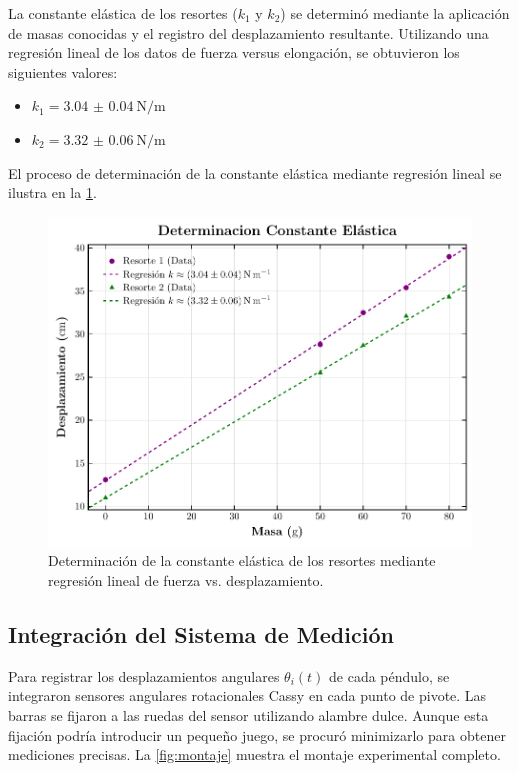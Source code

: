 La constante el\'astica de los resortes ($k_1$ y $k_2$) se
determin\'o mediante la aplicaci\'on de masas conocidas y el
registro del desplazamiento resultante. Utilizando
una regresi\'on lineal de los datos de fuerza versus elongaci\'on,
se obtuvieron los siguientes valores:

\begin{itemize}
  \item $k_1 = \qty{3.04(4)}{\N\per\m}$
  \item $k_2 = \qty{3.32(6)}{\N\per\m}$
\end{itemize}
El proceso de determinaci\'on de la constante el\'astica mediante
regresi\'on lineal se ilustra en la \cref{fig:regresion}.

\begin{figure}[htbp!]
  \centering
  \includegraphics[width=0.75\linewidth]{Figures/springs-plot.pdf}
  \caption{Determinaci\'on de la constante el\'astica de los resortes
  mediante regresi\'on lineal de fuerza vs. desplazamiento.}
  \label{fig:regresion}
\end{figure}

\subsection{Integraci\'on del Sistema de Medici\'on}

Para registrar los desplazamientos angulares $\theta_i(t)$ de
cada p\'endulo, se integraron sensores angulares rotacionales Cassy
en cada punto de pivote. Las barras se fijaron a las ruedas del
sensor utilizando alambre dulce. Aunque esta fijaci\'on
podr\'ia introducir un peque\~no juego, se procur\'o minimizarlo para
obtener mediciones precisas. La \cref{fig:montaje} muestra el
montaje experimental completo.

